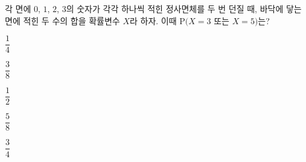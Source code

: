 각 면에 $0$, $1$, $2$, $3$의 숫자가 각각 하나씩 적힌 정사면체를 두 번 던질 때, 바닥에 닿는 면에 적힌 두 수의 합을 확률변수 $X$라 하자. 이때 $\mathrm{P}(X=3$ 또는 $X=5)$는?
\begin{choicesii}{\rule[-3ex]{0pt}{8ex}$\dfrac{1}{4}$}{\rule[-3ex]{0pt}{8ex}$\dfrac{3}{8}$}{\rule[-3ex]{0pt}{8ex}$\dfrac{1}{2}$}{\rule[-3ex]{0pt}{8ex}$\dfrac{5}{8}$}{\rule[-3ex]{0pt}{8ex}$\dfrac{3}{4}$}\end{choicesii}
